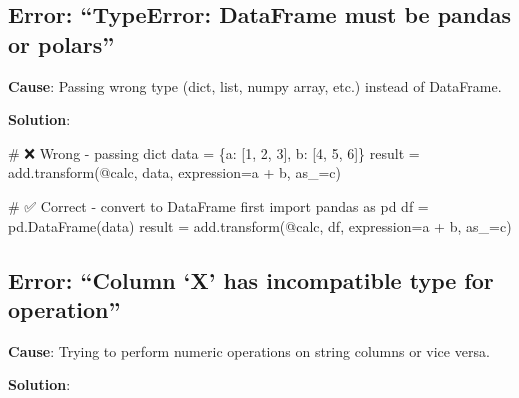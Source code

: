\documentclass[
  letterpaper,
]{scrbook}
\newenvironment{Shaded}{\begin{snugshade}}{\end{snugshade}}
\newcommand{\CommentTok}[1]{\textcolor[rgb]{0.37,0.37,0.37}{#1}}
\newcommand{\DecValTok}[1]{\textcolor[rgb]{0.68,0.00,0.00}{#1}}
\newcommand{\ImportTok}[1]{\textcolor[rgb]{0.00,0.46,0.62}{#1}}
\newcommand{\NormalTok}[1]{\textcolor[rgb]{0.00,0.23,0.31}{#1}}
\newcommand{\OperatorTok}[1]{\textcolor[rgb]{0.37,0.37,0.37}{#1}}
\newcommand{\StringTok}[1]{\textcolor[rgb]{0.13,0.47,0.30}{#1}}
\begin{document}
\subsection{Error: ``TypeError: DataFrame must be pandas or
polars''}\label{error-typeerror-dataframe-must-be-pandas-or-polars}

\textbf{Cause}: Passing wrong type (dict, list, numpy array, etc.)
instead of DataFrame.

\textbf{Solution}:

\begin{Shaded}
\begin{Highlighting}[]
\CommentTok{\# ❌ Wrong {-} passing dict}
\NormalTok{data }\OperatorTok{=}\NormalTok{ \{}\StringTok{\textquotesingle{}a\textquotesingle{}}\NormalTok{: [}\DecValTok{1}\NormalTok{, }\DecValTok{2}\NormalTok{, }\DecValTok{3}\NormalTok{], }\StringTok{\textquotesingle{}b\textquotesingle{}}\NormalTok{: [}\DecValTok{4}\NormalTok{, }\DecValTok{5}\NormalTok{, }\DecValTok{6}\NormalTok{]\}}
\NormalTok{result }\OperatorTok{=}\NormalTok{ add.transform(}\StringTok{\textquotesingle{}@calc\textquotesingle{}}\NormalTok{, data, expression}\OperatorTok{=}\StringTok{\textquotesingle{}a + b\textquotesingle{}}\NormalTok{, as\_}\OperatorTok{=}\StringTok{\textquotesingle{}c\textquotesingle{}}\NormalTok{)}

\CommentTok{\# ✅ Correct {-} convert to DataFrame first}
\ImportTok{import}\NormalTok{ pandas }\ImportTok{as}\NormalTok{ pd}
\NormalTok{df }\OperatorTok{=}\NormalTok{ pd.DataFrame(data)}
\NormalTok{result }\OperatorTok{=}\NormalTok{ add.transform(}\StringTok{\textquotesingle{}@calc\textquotesingle{}}\NormalTok{, df, expression}\OperatorTok{=}\StringTok{\textquotesingle{}a + b\textquotesingle{}}\NormalTok{, as\_}\OperatorTok{=}\StringTok{\textquotesingle{}c\textquotesingle{}}\NormalTok{)}
\end{Highlighting}
\end{Shaded}

\subsection{Error: ``Column `X' has incompatible type for
operation''}\label{error-column-x-has-incompatible-type-for-operation}

\textbf{Cause}: Trying to perform numeric operations on string columns
or vice versa.

\textbf{Solution}:
\end{document}
